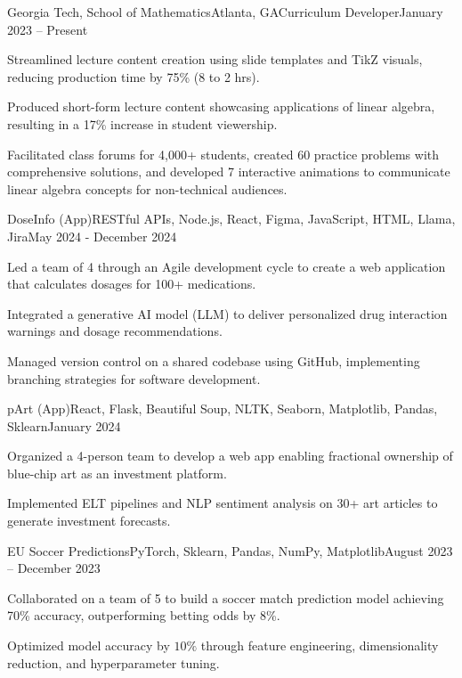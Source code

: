 \documentclass{article}
\begin{document}
\begin{flushleft}
    \begin{experience}{Georgia Tech, School of Mathematics}{Atlanta, GA}{Curriculum Developer}{January 2023 -- Present}
        \item Streamlined lecture content creation using slide templates and TikZ visuals, reducing production time by 75\% (8 to 2 hrs).
        \item Produced short-form lecture content showcasing applications of linear algebra, resulting in a 17\% increase in student viewership.
        \item Facilitated class forums for 4,000+ students, created 60 practice problems with comprehensive solutions, and developed 7 interactive animations to communicate linear algebra concepts for non-technical audiences.
    \end{experience}    

\vspace{5pt}

    \vspace{3pt}

    \begin{project}{DoseInfo (App)}{}{RESTful APIs, Node.js, React, Figma, JavaScript, HTML, Llama,  Jira}{May 2024 - December 2024}
        \item Led a team of 4 through an Agile development cycle to create a web application that calculates dosages for 100+ medications.
        \item Integrated a generative AI model (LLM) to deliver personalized drug interaction warnings and dosage recommendations.
        \item Managed version control on a shared codebase using GitHub, implementing branching strategies for software development.
    \end{project}

    \begin{project}{pArt (App)}{}{React, Flask, Beautiful Soup, NLTK, Seaborn, Matplotlib, Pandas, Sklearn}{January 2024}
        \item Organized a 4-person team to develop a web app enabling fractional ownership of blue-chip art as an investment platform.
        \item Implemented ELT pipelines and NLP sentiment analysis on 30+ art articles to generate investment forecasts.
    \end{project}    
    
    \begin{project}{EU Soccer Predictions}{}{PyTorch, Sklearn, Pandas, NumPy, Matplotlib}{August 2023 -- December 2023}
        \item Collaborated on a team of 5 to build a soccer match prediction model achieving 70\% accuracy, outperforming betting odds by 8\%.
        \item Optimized model accuracy by $10\%$ through feature engineering, dimensionality reduction, and hyperparameter tuning.
    \end{project}
    


\end{flushleft}
\end{document}
